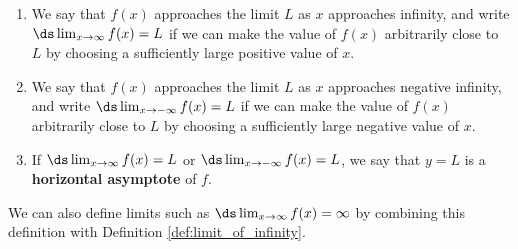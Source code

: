 {\begin{enumerate}
\item  We say that $f(x)$ approaches the limit $L$ as $x$ approaches infinity, and write $\ds \lim_{x\to\infty}f(x)=L$ if we can make the value of $f(x)$ arbitrarily close to $L$ by choosing a sufficiently large positive value of $x$.\\

\item We say that $f(x)$ approaches the limit $L$ as $x$ approaches negative infinity, and write $\ds \lim_{x\to-\infty}f(x)=L$ if we can make the value of $f(x)$ arbitrarily close to $L$ by choosing a sufficiently large negative value of $x$.
 \\
\item  If $\ds\lim_{x\rightarrow\infty} f(x)=L$ or $\ds\lim_{x\rightarrow-\infty} f(x)=L$, we say that $y=L$ is a \textbf{horizontal asymptote} of $f$.
\end{enumerate}
}
\restoreboxwidth


We can also define limits such as $\ds\lim_{x\rightarrow\infty}f(x)=\infty$ by combining this definition with Definition \ref{def:limit_of_infinity}. \\ %

